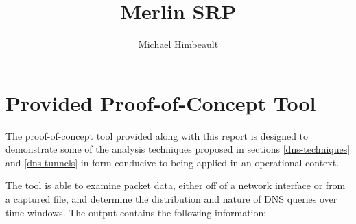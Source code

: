 \documentclass{article}
\theoremstyle{remark}
\theoremstyle{definition}
\theoremstyle{definition}
\theoremstyle{definition}
\begin{document}

\title{Merlin SRP}
\author{Michael Himbeault}

\maketitle

\tableofcontents

\newpage

\section{Provided Proof-of-Concept Tool}
The proof-of-concept tool provided along with this report is designed to demonstrate some of the analysis techniques proposed in sections \ref{dns-techniques} and \ref{dns-tunnels} in form conducive to being applied in an operational context.

The tool is able to examine packet data, either off of a network interface or from a captured file, and determine the distribution and nature of DNS queries over time windows. The output contains the following information:
\end{document}
